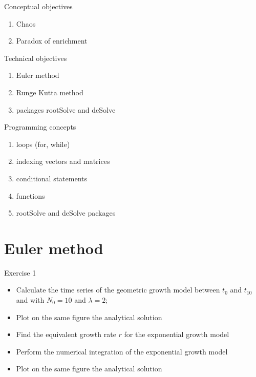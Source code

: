 \documentclass{eecslides}
\begin{document}
	\begin{frame}{Conceptual objectives}

	\begin{enumerate}
		\item Chaos
		\item Paradox of enrichment
	\end{enumerate}

	\end{frame}


	\begin{frame}{Technical objectives}

	\begin{enumerate}
		\item Euler method
		\item Runge Kutta method
		\item packages rootSolve and deSolve
	\end{enumerate}

	\end{frame}


	\begin{frame}{Programming concepts}

		\begin{enumerate}
			\item loops (for, while)
			\item indexing vectors and matrices
			\item conditional statements
			\item functions
			\item rootSolve and deSolve packages
		\end{enumerate}

	\end{frame}

	\section{Euler method}

	\begin{frame}{Exercise 1}
		\begin{itemize}
			\item Calculate the time series of the geometric growth model between $t_0$ and $t_{10}$ and with $N_0 = 10$ and $\lambda = 2$;	
			\item Plot on the same figure the analytical solution
			\item Find the equivalent growth rate $r$ for the exponential growth model
			\item Perform the numerical integration of the exponential growth model
			\item Plot on the same figure the analytical solution
		\end{itemize}
	\end{frame}
\end{document}
